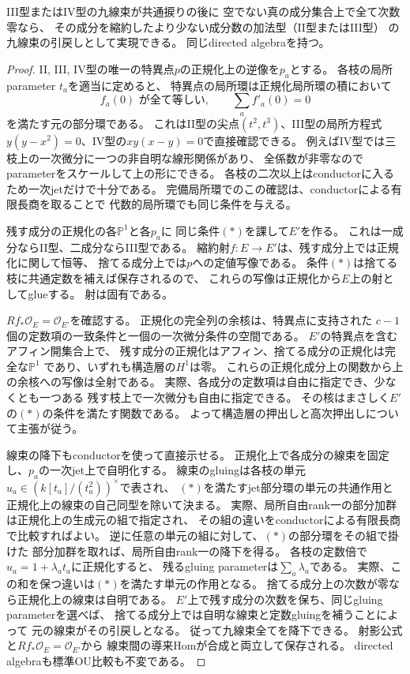 \begin{lemma}[加法型の共通零成分の縮約]
\label{lem:ou-additive-contract-common-zero}
III型またはIV型の九線束が共通捩りの後に
空でない真の成分集合上で全て次数零なら、
その成分を縮約したより少ない成分数の加法型（II型またはIII型）
の九線束の引戻しとして実現できる。
同じdirected algebraを持つ。
\end{lemma}
\begin{proof}
II, III, IV型の唯一の特異点$p$の正規化上の逆像を$p_a$とする。
各枝の局所parameter $t_a$を適当に定めると、
特異点の局所環は正規化局所環の積において
\[
 f_a(0)\text{ が全て等しい},\qquad
 \sum_a f'_a(0)=0
 \tag{$*$}
\]
を満たす元の部分環である。
これはII型の尖点$(t^2,t^3)$、III型の局所方程式
$y(y-x^2)=0$、IV型の$x y(x-y)=0$で直接確認できる。
例えばIV型では三枝上の一次微分に一つの非自明な線形関係があり、
全係数が非零なのでparameterをスケールして上の形にできる。
各枝の二次以上はconductorに入るため一次jetだけで十分である。
完備局所環でのこの確認は、conductorによる有限長商を取ることで
代数的局所環でも同じ条件を与える。

残す成分の正規化の各$\mathbb P^1$と各$p_a$に
同じ条件$(*)$を課して$E'$を作る。
これは一成分ならII型、二成分ならIII型である。
縮約射$f:E\to E'$は、残す成分上では正規化に関して恒等、
捨てる成分上では$p$への定値写像である。
条件$(*)$は捨てる枝に共通定数を補えば保存されるので、
これらの写像は正規化から$E$上の射としてglueする。
射は固有である。

$Rf_*\mathcal O_E=\mathcal O_{E'}$を確認する。
正規化の完全列の余核は、特異点に支持された
$c-1$個の定数項の一致条件と一個の一次微分条件の空間である。
$E'$の特異点を含むアフィン開集合上で、
残す成分の正規化はアフィン、捨てる成分の正規化は完全な$\mathbb P^1$
であり、いずれも構造層の$H^1$は零。
これらの正規化成分上の関数から上の余核への写像は全射である。
実際、各成分の定数項は自由に指定でき、少なくとも一つある
残す枝上で一次微分も自由に指定できる。
その核はまさしく$E'$の$(*)$の条件を満たす関数である。
よって構造層の押出しと高次押出しについて主張が従う。

線束の降下もconductorを使って直接示せる。
正規化上で各成分の線束を固定し、$p_a$の一次jet上で自明化する。
線束のgluingは各枝の単元
$u_a\in (k[t_a]/(t_a^2))^\times$で表され、
$(*)$を満たすjet部分環の単元の共通作用と
正規化上の線束の自己同型を除いて決まる。
実際、局所自由rank一の部分加群は正規化上の生成元の組で指定され、
その組の違いをconductorによる有限長商で比較すればよい。
逆に任意の単元の組に対して、$(*)$の部分環をその組で掛けた
部分加群を取れば、局所自由rank一の降下を得る。
各枝の定数倍で$u_a=1+\lambda_a t_a$に正規化すると、
残るgluing parameterは$\sum_a\lambda_a$である。
実際、この和を保つ違いは$(*)$を満たす単元の作用となる。
捨てる成分上の次数が零なら正規化上の線束は自明である。
$E'$上で残す成分の次数を保ち、同じgluing parameterを選べば、
捨てる成分上では自明な線束と定数gluingを補うことによって
元の線束がその引戻しとなる。
従って九線束全てを降下できる。
射影公式と$Rf_*\mathcal O_E=\mathcal O_{E'}$から
線束間の導来Homが合成と両立して保存される。
directed algebraも標準OU比較も不変である。
\end{proof}

